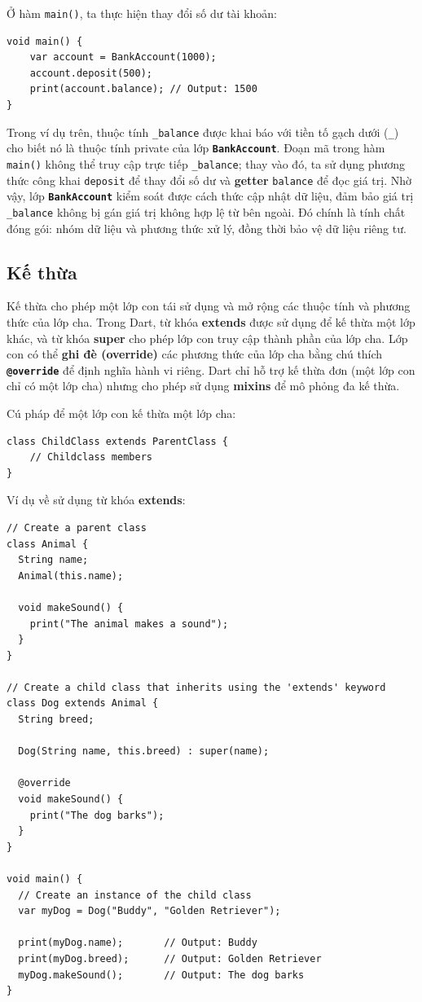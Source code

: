 \documentclass[../DoAn.tex]{subfiles}
\numberwithin{figure}{chapter}
\begin{document}
Ở hàm \texttt{main()}, ta thực hiện thay đổi số dư tài khoản:
\begin{lstlisting}
void main() { 
    var account = BankAccount(1000); 
    account.deposit(500); 
    print(account.balance); // Output: 1500 
}
\end{lstlisting}

Trong ví dụ trên, thuộc tính \texttt{\_balance} được khai báo với tiền tố gạch dưới (\texttt{\_}) cho biết nó là thuộc tính private của lớp \textbf{\texttt{BankAccount}}. Đoạn mã trong hàm \texttt{main()} không thể truy cập trực tiếp \texttt{\_balance}; thay vào đó, ta sử dụng phương thức công khai \texttt{deposit} để thay đổi số dư và \textbf{getter} \texttt{balance} để đọc giá trị. Nhờ vậy, lớp \textbf{\texttt{BankAccount}} kiểm soát được cách thức cập nhật dữ liệu, đảm bảo giá trị \texttt{\_balance} không bị gán giá trị không hợp lệ từ bên ngoài. Đó chính là tính chất đóng gói: nhóm dữ liệu và phương thức xử lý, đồng thời bảo vệ dữ liệu riêng tư.

\subsection{Kế thừa} 
Kế thừa cho phép một lớp con tái sử dụng và mở rộng các thuộc tính và phương thức của lớp cha. Trong Dart, từ khóa \textbf{extends} được sử dụng để kế thừa một lớp khác, và từ khóa \textbf{super} cho phép lớp con truy cập thành phần của lớp cha. Lớp con có thể \textbf{ghi đè (override)} các phương thức của lớp cha bằng chú thích \textbf{\texttt{@override}} để định nghĩa hành vi riêng. Dart chỉ hỗ trợ kế thừa đơn (một lớp con chỉ có một lớp cha) nhưng cho phép sử dụng \textbf{mixins} để mô phỏng đa kế thừa. 

Cú pháp để một lớp con kế thừa một lớp cha:
\begin{lstlisting}
class ChildClass extends ParentClass {
    // Childclass members
}
\end{lstlisting}

Ví dụ về sử dụng từ khóa \textbf{extends}: 
\begin{lstlisting}
// Create a parent class
class Animal {
  String name;
  Animal(this.name);

  void makeSound() {
    print("The animal makes a sound");
  }
}

// Create a child class that inherits using the 'extends' keyword
class Dog extends Animal {
  String breed;

  Dog(String name, this.breed) : super(name);

  @override
  void makeSound() {
    print("The dog barks");
  }
}

void main() {
  // Create an instance of the child class
  var myDog = Dog("Buddy", "Golden Retriever");

  print(myDog.name);       // Output: Buddy
  print(myDog.breed);      // Output: Golden Retriever
  myDog.makeSound();       // Output: The dog barks
}
\end{lstlisting}
\end{document}
